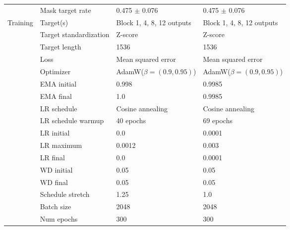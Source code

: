 \begin{table}[tbh]
{\begin{tabular}{llll}
          & Mask target rate  & 0.475 $\pm$ 0.076             & 0.475 $\pm$ 0.076             \\
Training  & Target(s)         & Block 1, 4, 8, 12 outputs     & Block 1, 4, 8, 12 outputs     \\
     & Target standardization & Z-score                       & Z-score                       \\
          & Target length     & 1536                          & 1536                          \\
          & Loss              & {Mean squared error}          & {Mean squared error}          \\
          & Optimizer         & AdamW({\footnotesize$\beta\!=\!(0.9, 0.95)$}) & AdamW({\footnotesize$\beta\!=\!(0.9, 0.95)$}) \\
          & EMA initial       & 0.998                         & 0.9985                        \\
          & EMA final         & 1.0                           & 0.9985                        \\
          & LR schedule       & Cosine annealing              & Cosine annealing              \\
          & LR schedule warmup& 40 epochs                     & 69 epochs                     \\
          & LR initial        & 0.0                           & 0.0001                        \\
          & LR maximum        & 0.0012                        & {0.003}                       \\
          & LR final          & 0.0                           & 0.0001                        \\
          & WD initial        & 0.05                          & 0.05                          \\
          & WD final          & 0.05                          & {0.05}                        \\
          & Schedule stretch  & 1.25                          & 1.0                           \\
          & Batch size        & 2048                          & 2048                          \\
          & Num epochs        & 300                           & 300                           \\
\bottomrule
\end{tabular}
}
\end{table}

